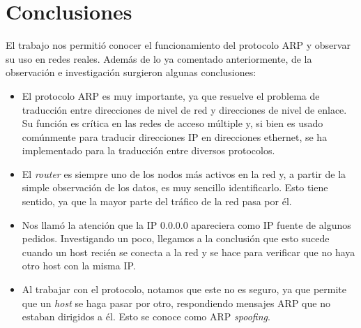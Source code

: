 \documentclass{article}
\begin{document}

\section{Conclusiones}
El trabajo nos permitió conocer el funcionamiento del protocolo ARP y observar
su uso en redes reales. Además de lo ya comentado anteriormente, de la
observación e investigación surgieron algunas conclusiones:

\begin{itemize}
    \item El protocolo ARP es muy importante, ya que resuelve el problema de
        traducción entre direcciones de nivel de red y direcciones de nivel de
        enlace. Su función es crítica en las redes de acceso múltiple y, si
        bien es usado comúnmente para traducir direcciones IP en direcciones
        ethernet, se ha implementado para la traducción entre diversos
        protocolos.
    \item El \emph{router} es siempre uno de los nodos más activos en la red
        y, a partir de la simple observación de los datos, es muy sencillo
        identificarlo. Esto tiene sentido, ya que la mayor parte del tráfico
        de la red pasa por él.
    \item Nos llamó la atención que la IP 0.0.0.0 apareciera como IP fuente de
        algunos pedidos. Investigando un poco, llegamos a la conclusión que
        esto sucede cuando un host recién se conecta a la red y se hace para
        verificar que no haya otro host con la misma IP.
    \item Al trabajar con el protocolo, notamos que este no es seguro, ya que
        permite que un \emph{host} se haga pasar por otro, respondiendo
        mensajes ARP que no estaban dirigidos a él. Esto se conoce como ARP
        \emph{spoofing}.
\end{itemize}
\end{document}
